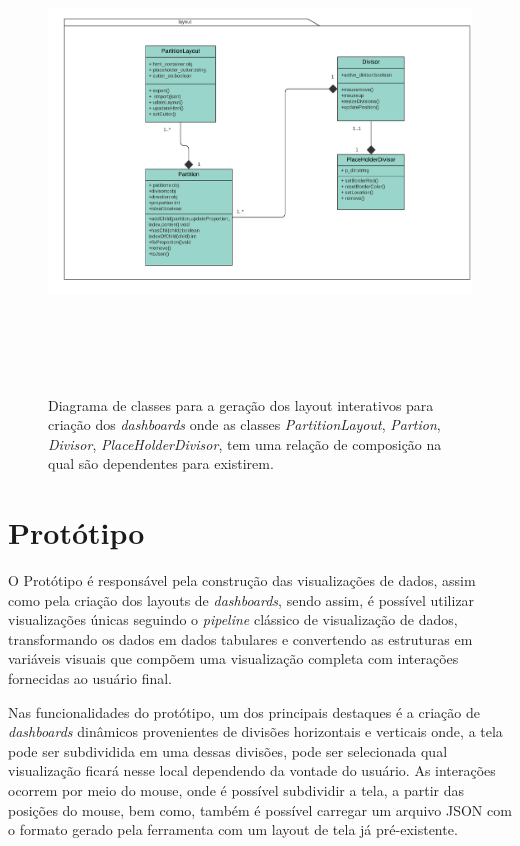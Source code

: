 \documentclass[
	12pt,				%
	openright,			%
	oneside,			%
	a4paper,			%
	english,			%
	brazil				%
	]{abntex2}
\begin{document}
\begin{figure}
	\caption{\label{classe_uml_layout}Diagrama de classes para a geração dos layout interativos para criação dos \textit{dashboards} onde as classes \textit{PartitionLayout}, \textit{Partion}, \textit{Divisor}, \textit{PlaceHolderDivisor}, tem uma relação de composição na qual são dependentes para existirem.}
	\begin{center}
	    \includegraphics[width=\textwidth,height=30pc]{figures/Diagrama layout parrtition.pdf}
	\end{center}
\end{figure}




\section{Protótipo}
O Protótipo é responsável pela construção das visualizações de dados, assim como pela criação dos layouts de  \textit{dashboards}, sendo assim, é possível utilizar visualizações únicas seguindo o \textit{pipeline} clássico de visualização de dados, transformando os dados em dados tabulares e convertendo as estruturas em variáveis visuais que compõem uma visualização completa com interações fornecidas ao usuário final.  

Nas funcionalidades do protótipo, um dos principais destaques é a criação de \textit{dashboards} dinâmicos provenientes de divisões horizontais e verticais onde, a tela pode ser subdividida em uma dessas divisões, pode ser selecionada qual visualização ficará nesse local dependendo da vontade do usuário.
As interações ocorrem por meio do mouse, onde é possível subdividir a tela, a partir das posições do mouse, bem como, também é possível carregar um arquivo JSON com o formato gerado pela ferramenta com um layout de tela já pré-existente.  
\end{document}
